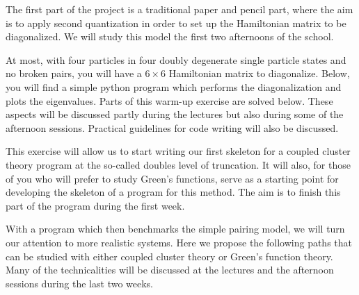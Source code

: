 \documentclass[%
twoside,                 %
final,                   %
10pt]{article}
\begin{document}
The first part of the project is a traditional paper and pencil part, where the aim is to 
apply second quantization in order to set up the Hamiltonian matrix to be diagonalized.
We will study this model the first two afternoons of the school. 

At most, with four particles in four doubly degenerate single particle states and no broken pairs,
you will have a $6 \times 6$ Hamiltonian matrix to diagonalize. Below, you will find a simple python program
which performs the diagonalization and plots the eigenvalues. Parts of this warm-up exercise are solved below. 
These aspects will be discussed partly during the lectures but also during some of the afternoon sessions.
Practical guidelines for code writing will also be discussed.


This exercise will allow us to start writing our first skeleton for a coupled cluster theory program at the so-called doubles level of truncation. It will also, for those of you who will prefer  to study Green's functions, serve as a 
starting point for developing the skeleton of a program for this method. The aim is to finish this part of the program during the first week.

With a program which then benchmarks the simple pairing model, we will turn our attention to more realistic systems.
Here we propose the following  paths that can be studied with either coupled cluster theory or Green's function theory. Many of the technicalities will be discussed at the lectures and the afternoon sessions during the last two weeks.
\end{document}

